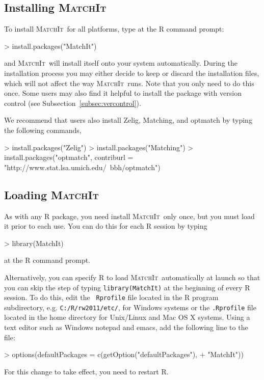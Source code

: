 \documentclass[oneside,letterpaper,titlepage]{article}
\newcommand{\MatchIt}{\textsc{MatchIt}}
\begin{document}
\subsection{Installing \MatchIt}
\label{subsec:install}

To install \MatchIt\ for all platforms, type at the R command prompt:
\begin{Schunk}
\begin{Sinput}
> install.packages("MatchIt")
\end{Sinput}
\end{Schunk}
and \MatchIt\ will install itself onto your system automatically.
During the installation process you may either decide to keep or
discard the installation files, which will not affect the way
\MatchIt\ runs.  Note that you only need to do this once.  Some users
may also find it helpful to install the package with version control
(see Subsection~\ref{subsec:vercontrol}). 

We recommend that users also install Zelig, Matching, and optmatch by
typing the following commands,
\begin{Schunk}
\begin{Sinput}
> install.packages("Zelig")
> install.packages("Matching")
> install.packages("optmatch", contriburl = "http://www.stat.lsa.umich.edu/~bbh/optmatch")
\end{Sinput}
\end{Schunk}

\subsection{Loading \MatchIt} \label{subsec:load}

As with any R package, you need install \MatchIt\ only once, but you
must load it prior to each use.  You can do this for each R session by
typing
\begin{Schunk}
\begin{Sinput}
> library(MatchIt)
\end{Sinput}
\end{Schunk}
at the R command prompt.  

Alternatively, you can specify R to load \MatchIt\ automatically at
launch so that you can skip the step of typing {\tt library(MatchIt)}
at the beginning of every R session.  To do this, edit the {\tt
  Rprofile} file located in the R program subdirectory, e.g.
\texttt{C:/R/rw2011/etc/}, for Windows systems or the {\tt .Rprofile}
file located in the home directory for Unix/Linux and Mac OS X
systems.  Using a text editor such as Windows notepad and emacs, add
the following line to the file:
\begin{Schunk}
\begin{Sinput}
> options(defaultPackages = c(getOption("defaultPackages"), 
+     "MatchIt"))
\end{Sinput}
\end{Schunk}
For this change to take effect, you need to restart R.
\end{document}
